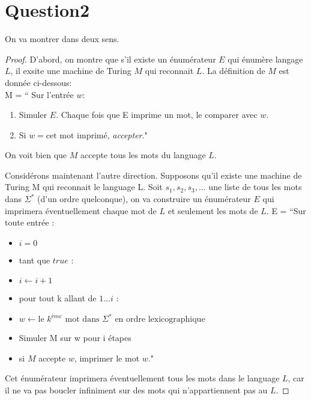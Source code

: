 \documentclass{article}
\begin{document}
\section*{Question2}
On va montrer dans deux sens.
\begin{proof}
	D'abord, on montre que s'il existe un énumérateur $E$ qui énumère langage $L$, il exsite une machine de Turing $M$ qui reconnait $L$. La définition de $M$ est donnée ci-dessous:\\
M = `` Sur l'entrée $w$: 
	\begin{enumerate}
		\item Simuler $E$. Chaque fois que E imprime un mot, le comparer avec $w$. 

		\item  Si $w = \text{cet mot imprimé}$, \textit{accepter}." 
	\end{enumerate}
	On voit bien que $M$ accepte tous les mots du language $L$.
	
	Considérons maintenant l'autre direction. Supposons qu'il existe une machine de Turing M qui reconnait le language L. Soit $s_1, s_2, s_3,\ldots$ une liste de tous les mots dans $\Sigma^{*}$ (d'un ordre quelconque), on va construire un énumérateur $E$ qui imprimera éventuellement chaque mot de $L$ et seulement les mots de $L$. 
E = ``Sur toute entrée : 
\begin{itemize}
\setlength{\itemsep}{-0.5em}
	\item[] \qquad$i = 0$ 
	\item[]\qquad tant que $true$ :
\item[] \qquad\qquad $i \gets i+1$ 
\item[] \qquad\qquad pour tout k allant de $1\ldots i$ :
\item[]\qquad\qquad\qquad $w \gets  \text{le $k^{ème}$ mot dans $\Sigma^{*}$ en ordre lexicographique }$ 
\item[] \qquad\qquad\qquad Simuler M sur w pour i étapes
\item[] \qquad\qquad\qquad si $M$ accepte $w$, imprimer le mot $w$."

\end{itemize}
Cet énumérateur imprimera éventuellement tous les mots dans le language $L$, car il ne va pas boucler infiniment sur des mots qui n'appartiennent pas au $L$.
\end{proof}
\end{document}

